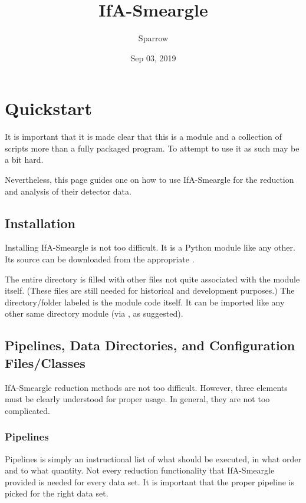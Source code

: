 \documentclass[letterpaper,10pt,english]{sphinxmanual}
\title{IfA-Smeargle}
\date{Sep 03, 2019}
\author{Sparrow}
\begin{document}
\pagestyle{empty}
\sphinxmaketitle
\pagestyle{plain}
\sphinxtableofcontents
\pagestyle{normal}
\label{\detokenize{index::doc}}



\chapter{Quickstart}
\label{\detokenize{quickstart:quickstart}}\label{\detokenize{quickstart::doc}}
It is important that it is made clear that this is a module and a collection
of scripts more than a fully packaged program. To attempt to use it as such
may be a bit hard.

Nevertheless, this page guides one on how to use IfA-Smeargle for the
reduction and analysis of their detector data.


\section{Installation}
\label{\detokenize{quickstart:installation}}
Installing IfA-Smeargle is not too difficult. It is a Python module like any
other. Its source can be downloaded from the appropriate .

The entire directory is filled with other files not quite associated
with the module itself. (These files are still needed for historical and
development purposes.) The directory/folder labeled  is the
module code itself. It can be imported like any other same directory module
(via , as suggested).


\section{Pipelines, Data Directories, and Configuration Files/Classes}
\label{\detokenize{quickstart:pipelines-data-directories-and-configuration-files-classes}}
IfA-Smeargle reduction methods are not too difficult. However,
three elements must be clearly understood for proper usage. In general, they
are not too complicated.


\subsection{Pipelines}
\label{\detokenize{quickstart:pipelines}}
Pipelines is simply an instructional list of what should be executed, in
what order and to what quantity. Not every reduction functionality that
IfA-Smeargle provided is needed for every data set. It is important that
the proper pipeline is picked for the right data set.
\end{document}
